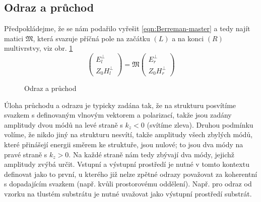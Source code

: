 \subsection*{Odraz a průchod}

Předpokládejme, že se nám podařilo vyřešit \eqref{eqn:Berreman-master} a tedy najít matici $\mathfrak{M}$, která svazuje příčná pole na začátku $(L)$ a na konci $(R)$ multivrstvy, viz obr. \ref{fig:odraz-pruchod}
\begin{equation}
    \begin{pmatrix} E^\perp_l \\ Z_0 H^\perp_l \end{pmatrix}=\mathfrak{M} \begin{pmatrix} E^\perp_r \\ Z_0 H^\perp_r \end{pmatrix}
\end{equation}

\begin{figure}
    \centering
    \caption{Odraz a průchod}
    \label{fig:odraz-pruchod}
\end{figure}

Úloha průchodu a odrazu je typicky zadána tak, že na strukturu posvítíme svazkem s definovaným vlnovým vektorem a polarizací, takže jsou zadány amplitudy dvou módů na levé straně s $k_z < 0$ (svítíme zleva).
Druhou podmínku volíme, že nikdo jiný na strukturu nesvítí, takže amplitudy všech zbylých módů, které přinášejí energii směrem ke struktuře, jsou nulové; to jsou dva módy na pravé straně s $k_z > 0$.
Na každé straně nám tedy zbývají dva módy, jejichž amplitudy zvýbá určit.
Vstupní a výstupní prostředí je nutné v tomto kontextu definovat jako to první, u kterého již nelze zpětné odrazy považovat za koherentní s dopadajícím svazkem (např. kvůli prostorovému oddělení).
Např. pro odraz od vzorku na tlustém substrátu je nutné uvažovat jako výstupní prostředí substrát.

